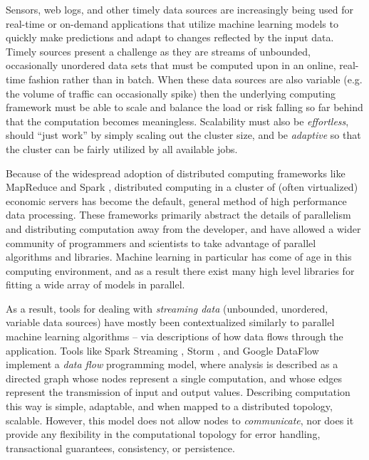 \documentclass[conference,twocolumn,10pt]{IEEEtran}
\begin{document}
Sensors, web logs, and other timely data sources are increasingly being used for  real-time or on-demand applications that utilize machine learning models to quickly make predictions and adapt to changes reflected by the input data. Timely sources present a challenge as they are streams of unbounded, occasionally unordered data sets that must be computed upon in an online, real-time fashion rather than in batch. When these data sources are also variable (e.g. the volume of traffic can occasionally spike) then the underlying computing framework must be able to scale and balance the load or risk falling so far behind that the computation becomes meaningless. Scalability must also be \textit{effortless}, should ``just work'' by simply scaling out the cluster size, and be \textit{adaptive} so that the cluster can be fairly utilized by all available jobs.

Because of the widespread adoption of distributed computing frameworks like MapReduce \cite{dean_mapreduce:_2008} and Spark \cite{zaharia_resilient_2012}, distributed computing in a cluster of (often virtualized) economic servers has become the default, general method of high performance data processing. These frameworks primarily abstract the details of parallelism and distributing computation away from the developer, and have allowed a wider community of programmers and scientists to take advantage of parallel algorithms and libraries. Machine learning in particular has come of age in this computing environment, and as a result there exist many high level libraries for fitting a wide array of models in parallel.

As a result, tools for dealing with \textit{streaming data} (unbounded, unordered, variable data sources) have mostly been contextualized similarly to parallel machine learning algorithms -- via descriptions of how data flows through the application. Tools like Spark Streaming \cite{zaharia_discretized_2012}, Storm \cite{toshniwal_storm_2014}, and Google DataFlow \cite{akidau_dataflow_2015} implement a \textit{data flow} programming model, where analysis is described as a directed graph whose nodes represent a single computation, and whose edges represent the transmission of input and output values. Describing computation this way is simple, adaptable, and when mapped to a distributed topology, scalable. However, this model does not allow nodes to \textit{communicate}, nor does it provide any flexibility in the computational topology for error handling, transactional guarantees, consistency, or persistence.
\end{document}
